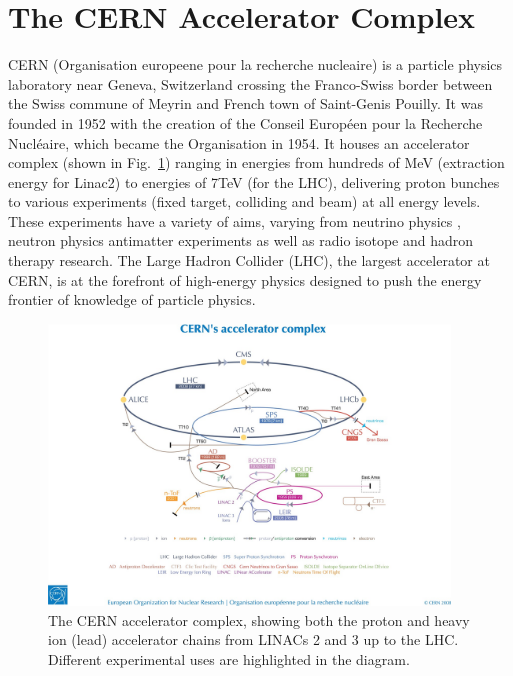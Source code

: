 \section{The CERN Accelerator Complex}

CERN (Organisation europeene pour la recherche nucleaire) is a particle physics laboratory near Geneva, Switzerland crossing the Franco-Swiss border between the Swiss commune of Meyrin and French town of Saint-Genis Pouilly. It was founded in 1952 with the creation of the Conseil Europ\'{e}en pour la Recherche Nucl\'{e}aire, which became the Organisation in 1954. It houses an accelerator complex (shown in Fig.~\ref{fig:CERN-acc-complex}) ranging in energies from hundreds of MeV (extraction energy for Linac2) to energies of 7TeV (for the LHC), delivering proton bunches to various experiments (fixed target, colliding and beam) at all energy levels. These experiments have a variety of aims, varying from neutrino physics \cite{Bailey:CNGS}, neutron physics \cite{ntof} antimatter experiments \cite{Gabrielse:ATRAP,Hori:ASACUSA,Hangst:ALPHA} as well as radio isotope \cite{Kadi:ISOLDE} and hadron therapy \cite{Maggiore:ACE} research. The Large Hadron Collider (LHC), the largest accelerator at CERN, is at the forefront of high-energy physics designed to push the energy frontier of knowledge of particle physics.

\begin{figure}
\begin{center}
\includegraphics[width=0.95\textwidth]{Introduction/figures/cernaccelerators.jpg}
\end{center}
\caption{The CERN accelerator complex, showing both the proton and heavy ion (lead) accelerator chains from LINACs 2 and 3 up to the LHC. Different experimental uses are highlighted in the diagram.}
\label{fig:CERN-acc-complex}
\end{figure}

